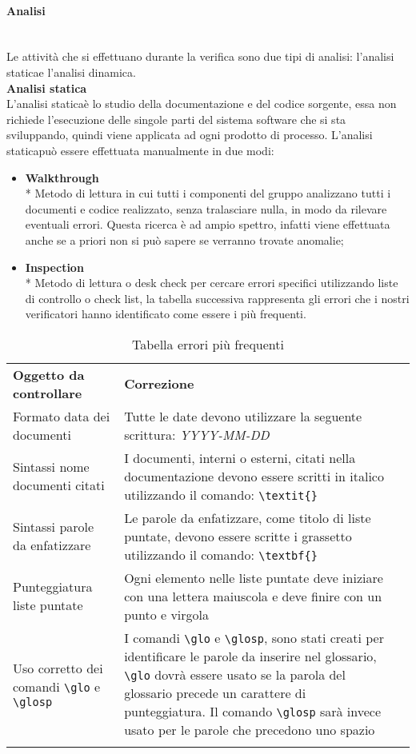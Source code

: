 \paragraph{Analisi}\mbox{}\\ [1mm]
Le attività che si effettuano durante la verifica sono due tipi di analisi: l'analisi statica\glosp e l'analisi dinamica. \\[2mm]
\textbf{Analisi statica}\mbox{}\\ [1mm]
L'analisi statica\glosp è lo studio della documentazione e del codice sorgente, essa non richiede l'esecuzione delle singole parti del sistema software che si sta sviluppando, quindi viene applicata ad ogni prodotto di processo. L'analisi statica\glosp può essere effettuata manualmente in due modi:
\begin{itemize}
	\item \textbf{Walkthrough} \\*
	Metodo di lettura in cui tutti i componenti del gruppo analizzano tutti i documenti e codice realizzato, senza tralasciare nulla, in modo da rilevare eventuali errori. Questa ricerca è ad ampio spettro, infatti viene effettuata anche se a priori non si può sapere se verranno trovate anomalie;
	\item \textbf{Inspection} \\*
	Metodo di lettura o desk check per cercare errori specifici utilizzando liste di controllo o check list, la tabella successiva rappresenta gli errori che i nostri verificatori hanno identificato come essere i più frequenti.
\end{itemize}
\renewcommand\thetable{3.1}
\begin{longtable} {
		>{\centering}p{55mm} 
		>{\centering}p{55mm}
		>{}p{0mm}}
	\rowcolor{gray!50}
	\textbf{Oggetto da controllare} & \textbf{Correzione} & \TBstrut \\[2mm]
	Formato data dei documenti & Tutte le date devono utilizzare la seguente scrittura: \textit{YYYY-MM-DD}  &  \TBstrut \\[2mm]
	Sintassi nome documenti citati & I documenti, interni o esterni, citati nella documentazione devono essere scritti in italico utilizzando il comando: \verb|\textit{}|  &  \TBstrut \\[2mm]
	Sintassi parole da enfatizzare & Le parole da enfatizzare, come titolo di liste puntate, devono essere scritte i grassetto utilizzando il comando: \verb|\textbf{}|  &  \TBstrut \\[2mm]
	Punteggiatura liste puntate & Ogni elemento nelle liste puntate deve iniziare con una lettera maiuscola e deve finire con un punto e virgola &  \TBstrut \\[2mm]
	Uso corretto dei comandi \verb|\glo| e \verb|\glosp| & I comandi \verb|\glo| e \verb|\glosp|, sono stati creati per identificare le parole da inserire nel glossario, \verb|\glo| dovrà essere usato se la parola del glossario precede un carattere di punteggiatura. Il comando \verb|\glosp| sarà invece usato per le parole che precedono uno spazio &  \TBstrut \\	[2mm]
	\rowcolor{white}
	\caption{Tabella errori più frequenti}
\end{longtable}


